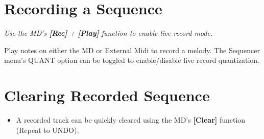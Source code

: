 \section{Recording a Sequence}
\textit{Use the MD's \textbf{\textit{[Rec]}} + \textbf{[\textbf{Play}]} function to enable live record mode.\\}

Play notes on either the MD or External Midi to record a melody. The Sequencer menu's QUANT option can be toggled to enable/disable live record quantization.

\section{Clearing Recorded Sequence}
\begin{itemize}
\item A recorded track can be quickly cleared using the MD's \textbf{[Clear]} function (Repeat to UNDO).
\end{itemize}

